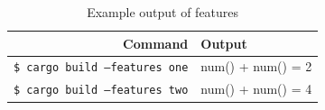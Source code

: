 \begin{table}[ht]
\begin{center}
\begin{tabular}{r|l}
\textbf{Command} & \textbf{Output}                          \\
\hline
\texttt{\$ cargo build --features one}  & num() + num() = 2 \\
\texttt{\$ cargo build --features two}  & num() + num() = 4 \\
\hline
\end{tabular}
\caption{Example output of features}
\label{tab:rust_features_output}
\end{center}
\end{table}
